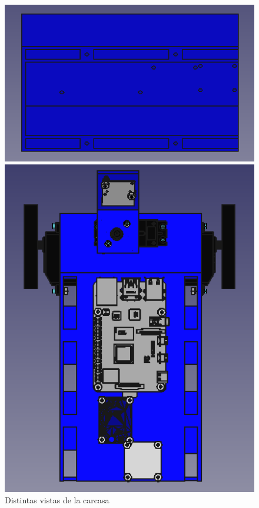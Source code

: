 \begin{figure}[ht!]
	\centering
	\begin{minipage}{0.46\linewidth}
		\centering
		\includegraphics[width=\linewidth]{figs/cap5/superior2.png}
	\end{minipage}
	\hspace{1cm}
	\begin{minipage}{0.45\linewidth}
		\centering
		\includegraphics[angle=270, width=\linewidth]{figs/cap5/superior1m.png}
	\end{minipage}
	\caption{Distintas vistas de la carcasa}
	\label{fig:psuperior}
\end{figure}


